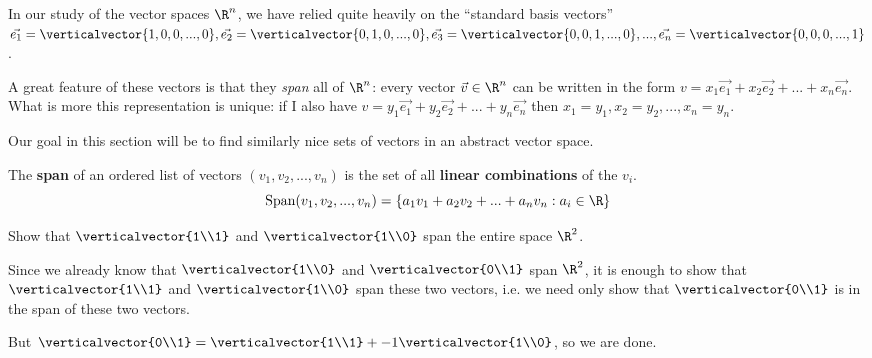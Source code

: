 
\begin{Basis and Dimension}

In our study of the vector spaces $\R^n$, we have relied quite heavily on the ``standard basis vectors'' $\vec{e_1}  =\verticalvector{1,0,0,...,0}, 
\vec{e_2}  =\verticalvector{0,1,0,...,0}, \vec{e_3}  =\verticalvector{0,0,1,...,0},..., \vec{e_n}  =\verticalvector{0,0,0,...,1}$.  

A great feature of these vectors is that they \textit{span} all of $\R^n$:  every vector $\vec{v} \in \R^n$ can be written in the form
 $v = x_1\vec{e_1} +x_2\vec{e_2}+...+x_n\vec{e_n}$.  What is more this representation is unique:  if I also have $v = y_1\vec{e_1} +y_2\vec{e_2}+...+y_n\vec{e_n}$
 then $x_1 = y_1, x_2 = y_2, ..., x_n=y_n$.
 
 Our goal in this section will be to find similarly nice sets of vectors in an abstract vector space.
 
 \begin{definition}
 	The \textbf{span} of an ordered list of vectors $(v_1,v_2, ...,v_n)$ is the set of all \textbf{linear combinations} of the $v_i$.
 	\[\textrm{Span}(v_1,v_2, ...,v_n) = \{a_1v_1+a_2v_2+...+a_nv_n: a_i \in \R\}\]
 \end{definition}
 
 
 	Show that $\verticalvector{1\\1}$ and $\verticalvector{1\\0}$ span the entire space $\R^2$.

\begin{free-response}
	Since we already know that $\verticalvector{1\\0}$ and $\verticalvector{0\\1}$ span $\R^2$,
	 it is enough to show that $\verticalvector{1\\1}$ and $\verticalvector{1\\0}$ span these two vectors, i.e.
	 we need only show that $\verticalvector{0\\1}$ is in the span of these two vectors.
	 
	 But $\verticalvector{0\\1} = \verticalvector{1\\1} +-1\verticalvector{1\\0}$, so we are done.
	 

\end{free-response}
\end{Basis and Dimension}
